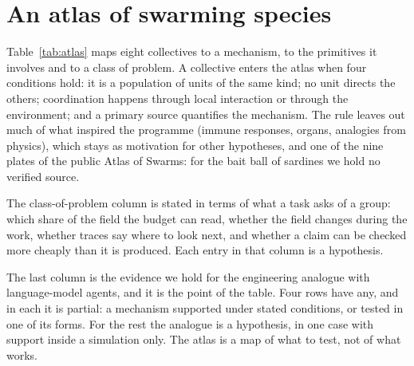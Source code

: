\documentclass[10pt,twocolumn]{article}
\begin{document}
\section{An atlas of swarming species}\label{sec:atlas}

Table~\ref{tab:atlas} maps eight collectives to a mechanism, to the primitives it involves and to a class of problem. A collective enters the atlas when four conditions hold: it is a population of units of the same kind; no unit directs the others; coordination happens through local interaction or through the environment; and a primary source quantifies the mechanism. The rule leaves out much of what inspired the programme (immune responses, organs, analogies from physics), which stays as motivation for other hypotheses, and one of the nine plates of the public Atlas of Swarms: for the bait ball of sardines we hold no verified source.

The class-of-problem column is stated in terms of what a task asks of a group: which share of the field the budget can read, whether the field changes during the work, whether traces say where to look next, and whether a claim can be checked more cheaply than it is produced. Each entry in that column is a hypothesis.

The last column is the evidence we hold for the engineering analogue with language-model agents, and it is the point of the table. Four rows have any, and in each it is partial: a mechanism supported under stated conditions, or tested in one of its forms. For the rest the analogue is a hypothesis, in one case with support inside a simulation only. The atlas is a map of what to test, not of what works.
\end{document}
